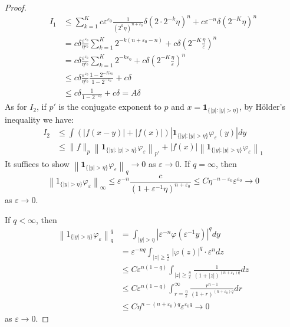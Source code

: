\documentclass[12pt,openany]{book}
\theoremstyle{definition}
\begin{document}
\begin{proof}
$$\begin{aligned}
I_1 &\leqslant \sum_{k=1}^K c \varepsilon^{\varepsilon_0} \frac{1}{\left(2^k \eta\right)^{n+\varepsilon_0}} \delta \left(2 \cdot 2^{-k} \eta\right)^n + c \varepsilon^{-n} \delta \left(2^{-K} \eta\right)^n \\
&=c \delta \frac{\varepsilon^{\varepsilon_0}}{\eta^{\varepsilon_0}} \sum_{k=1}^K 2^{-k(n+\varepsilon_0-n)} + c \delta \left(2^{-K} \frac{\eta}{\varepsilon}\right)^n \\
&= c \delta \frac{\varepsilon^{\varepsilon_0}}{\eta^{\varepsilon_0}} \sum_{k=1}^K 2^{-k\varepsilon_0} + c \delta \left(2^{-K} \frac{\eta}{\varepsilon}\right)^n \\
&\leq c \delta \frac{\varepsilon^{\varepsilon_0}}{\eta^{\varepsilon_0}} \frac{1 - 2^{-K\varepsilon_0}}{1 - 2^{-\varepsilon_0}} + c \delta \\
&\leq c \delta \frac{1}{1 - 2^{-\varepsilon_0}} + c \delta = A \delta
\end{aligned}
$$
As for $I_2$, if $p'$ is the conjugate exponent to $p$ and $x = \textbf{1}_{\{|y|: |y| > \eta\}}$, by Hölder's inequality we have:
$$
\begin{aligned}
I_2 &\leqslant \int (|f(x-y)| + |f(x)|) \left| \textbf{1}_{\{|y|: |y| > \eta\}} \varphi_{\varepsilon}(y) \right| dy \\
&\leqslant \|f\|_p \left\| \textbf{1}_{\{|y|: |y| > \eta\}} \varphi_{\varepsilon} \right\|_{p'} + |f(x)| \left\| \textbf{1}_{\{|y|: |y| > \eta\}} \varphi_{\varepsilon} \right\|_1
\end{aligned}
$$
It suffices to show $\left\| \textbf{1}_{\{|y| > \eta\}} \varphi_{\varepsilon} \right\|_q \rightarrow 0$ as $\varepsilon \rightarrow 0$.
If $q = \infty$, then
$$
\left\| 1_{\{|y| > \eta\}} \varphi_{\varepsilon} \right\|_{\infty} \leqslant \varepsilon^{-n} \frac{c}{(1 + \varepsilon^{-1} \eta)^{n+\varepsilon_0}} \leq C \eta^{-n-\varepsilon_0} \varepsilon^{\varepsilon_0} \rightarrow 0
$$
as $\varepsilon \rightarrow 0$.

If $q < \infty$, then
$$
\begin{aligned}
\left\| 1_{\{|y| > \eta\}} \varphi_{\varepsilon} \right\|_q^q &= \int_{|y| > \eta} \left| \varepsilon^{-n} \varphi\left(\varepsilon^{-1} y\right) \right|^q dy \\
&= \varepsilon^{-nq} \int_{|z| \geqslant \frac{\eta}{\varepsilon}} |\varphi(z)|^q \cdot \varepsilon^n dz \\
&\leq C \varepsilon^{n(1-q)} \int_{|z| \geqslant \frac{\eta}{\varepsilon}} \frac{1}{(1 + |z|)^{(n+\varepsilon_0)q}} dz \\
&\leq C \varepsilon^{n(1-q)} \int_{r = \frac{\eta}{\varepsilon}}^{\infty} \frac{r^{n-1}}{(1 + r)^{(n+\varepsilon_0)q}} dr \\
&\leq C \eta^{n - (n + \varepsilon_0)q} \varepsilon^{\varepsilon_0 q} \longrightarrow 0
\end{aligned}
$$
as $\varepsilon \rightarrow 0$.
\end{proof} 
\end{document}
